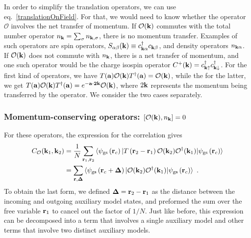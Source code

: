\documentclass[reprint,hidelinks,onecolumn]{revtex4-2}
\begin{document}
In order to simplify the translation operators, we can use eq.~\ref{translationOnField}. For that, we would need to know whether the operator \(\mathcal{O}\) involves the net transfer of momentum. If \(\mathcal{O}({\bf k})\) commutes with the total number operator \(n_{\bf k} = \sum_\sigma n_{{\bf k},\sigma}\), there is no momentum transfer. Examples of such operators are spin operators, \(S_{\alpha\beta}({\bf k}) \equiv c^\dagger_{{\bf k \alpha}}c_{{\bf k}\beta}\), and density operators \(n_{{\bf k}\alpha}\). If \(\mathcal{O}({\bf k})\) does not commute with \(n_{\bf k}\), there is a net transfer of momentum, and one such operator would be the charge isospin operator \(C^+({\bf k}) = c^\dagger_{{\bf k}\uparrow}c^\dagger_{{\bf k}\downarrow}\). For the first kind of operators, we have \(T({\bf a})\mathcal{O}({\bf k})T^\dagger({\bf a}) = \mathcal{O}({\bf k})\), while the for the latter, we get \(T({\bf a})\mathcal{O}({\bf k})T^\dagger({\bf a}) = e^{-{\bf a}\cdot{\bf 2k}}\mathcal{O}({\bf k})\), where \(2{\bf k}\) represents the momentum being transferred by the operator. We consider the two cases separately.

\subsubsection{Momentum-conserving operators: \(\left[\mathcal{O}({\bf k}), n_{{\bf k}}\right] = 0\)}
For these operators, the expression for the correlation gives
\begin{equation}\begin{aligned}
	C_{\mathcal{O}}({\bf k}_1,{\bf k}_2) &= \frac{1}{N}\sum_{{\bf r}_1,{\bf r}_2}\braket{\psi_\text{gs}\left({\bf r}_c\right) | T\left({\bf r}_2 - {\bf r}_1\right) \mathcal{O}({\bf k}_2)\mathcal{O}^\dagger({\bf k}_1) | \psi_\text{gs}\left({\bf r}_c\right)}\\
										 &=\sum_{{\bf r},{\bf \Delta}}\braket{\psi_\text{gs}\left({\bf r}_c + {\bf \Delta}\right) | \mathcal{O}({\bf k}_2)\mathcal{O}^\dagger({\bf k}_1) | \psi_\text{gs}\left({\bf r}_c\right)}~.
\end{aligned}\end{equation}
To obtain the last form, we defined \({\bf \Delta}={\bf r}_2 - {\bf r}_1\) as the distance between the incoming and outgoing auxiliary model states, and preformed the sum over the free variable \({\bf r}_1\) to cancel out the factor of \(1/N\). Just like before, this expression can be decomposed into a term that involves a single auxiliary model and other terms that involve two distinct auxiliary models.
\end{document}
